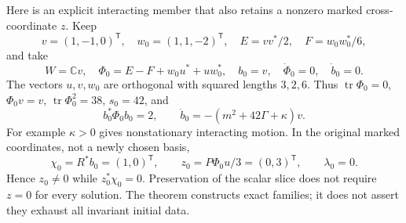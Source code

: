 Here is an explicit interacting member that also retains a nonzero marked
cross-coordinate $z$. Keep
\[
 v=(1,-1,0)^{\mathsf T},\quad w_0=(1,1,-2)^{\mathsf T},\quad
 E=vv^*/2,\quad F=w_0w_0^*/6,
\]
and take
\begin{equation}\label{q444:nonzero-sector}
 W=\mathbb Cv,\quad \Phi_0=E-F+w_0u^*+uw_0^*,\quad b_0=v,
 \quad \dot\Phi_0=0,\quad\dot b_0=0.
\end{equation}
The vectors $u,v,w_0$ are orthogonal with squared lengths $3,2,6$.
Thus $\operatorname{tr}\Phi_0=0$, $\Phi_0v=v$,
$\operatorname{tr}\Phi_0^2=38$, $s_0=42$, and
\[
 b_0^*\Phi_0b_0=2,\qquad
 \ddot b_0=-(m^2+42\Gamma+\kappa)v.
\]
For example $\kappa>0$ gives nonstationary interacting motion. In the
original marked coordinates, not a newly chosen basis,
\[
 \chi_0=R^*b_0=(1,0)^{\mathsf T},\qquad
 z_0=P\Phi_0u/3=(0,3)^{\mathsf T},\qquad\lambda_0=0.
\]
Hence $z_0\ne0$ while $z_0^*\chi_0=0$. Preservation of the scalar slice
does not require $z=0$ for every solution. The theorem constructs exact
families; it does not assert they exhaust all invariant initial data.

